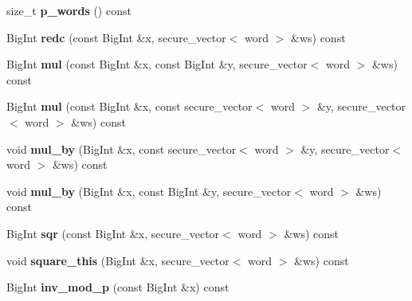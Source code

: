 \begin{DoxyCompactItemize}
size\+\_\+t {\bfseries p\+\_\+words} () const
\item 
\mbox{\label{class_botan_1_1_montgomery___params_a273c5267fffc5d4caedf11b07db24d04}} 
Big\+Int {\bfseries redc} (const Big\+Int \&x, secure\+\_\+vector$<$ word $>$ \&ws) const
\item 
\mbox{\label{class_botan_1_1_montgomery___params_a400864866151678e618dab16c8515e9d}} 
Big\+Int {\bfseries mul} (const Big\+Int \&x, const Big\+Int \&y, secure\+\_\+vector$<$ word $>$ \&ws) const
\item 
\mbox{\label{class_botan_1_1_montgomery___params_a937b817db430ca8801fa7a5b9e7e2e4d}} 
Big\+Int {\bfseries mul} (const Big\+Int \&x, const secure\+\_\+vector$<$ word $>$ \&y, secure\+\_\+vector$<$ word $>$ \&ws) const
\item 
\mbox{\label{class_botan_1_1_montgomery___params_a34e37da9a9ba693bde618039bb60e62a}} 
void {\bfseries mul\+\_\+by} (Big\+Int \&x, const secure\+\_\+vector$<$ word $>$ \&y, secure\+\_\+vector$<$ word $>$ \&ws) const
\item 
\mbox{\label{class_botan_1_1_montgomery___params_a866695a95010d67ef696aac0190ddda9}} 
void {\bfseries mul\+\_\+by} (Big\+Int \&x, const Big\+Int \&y, secure\+\_\+vector$<$ word $>$ \&ws) const
\item 
\mbox{\label{class_botan_1_1_montgomery___params_a47f91e47c608e4a21e2b758eeb0fe067}} 
Big\+Int {\bfseries sqr} (const Big\+Int \&x, secure\+\_\+vector$<$ word $>$ \&ws) const
\item 
\mbox{\label{class_botan_1_1_montgomery___params_af70fbafde16b8802fe67215f4fe15159}} 
void {\bfseries square\+\_\+this} (Big\+Int \&x, secure\+\_\+vector$<$ word $>$ \&ws) const
\item 
\mbox{\label{class_botan_1_1_montgomery___params_a75f6ec416fff4977863bc4b347106819}} 
Big\+Int {\bfseries inv\+\_\+mod\+\_\+p} (const Big\+Int \&x) const
\end{DoxyCompactItemize}


